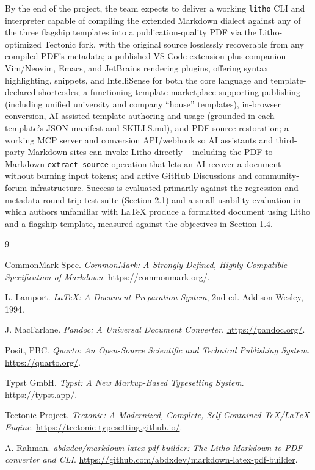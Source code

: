 \documentclass[a4paper,twoside]{article}
\begin{document}
By the end of the project, the team expects to deliver a working \texttt{litho} CLI and interpreter capable of compiling the extended Markdown dialect against any of the three flagship templates into a publication-quality PDF via the Litho-optimized Tectonic fork, with the original source losslessly recoverable from any compiled PDF's metadata; a published VS Code extension plus companion Vim/Neovim, Emacs, and JetBrains rendering plugins, offering syntax highlighting, snippets, and IntelliSense for both the core language and template-declared shortcodes; a functioning template marketplace supporting publishing (including unified university and company ``house'' templates), in-browser conversion, AI-assisted template authoring and usage (grounded in each template's JSON manifest and SKILLS.md), and PDF source-restoration; a working MCP server and conversion API/webhook so AI assistants and third-party Markdown sites can invoke Litho directly -- including the PDF-to-Markdown \texttt{extract-source} operation that lets an AI recover a document without burning input tokens; and active GitHub Discussions and community-forum infrastructure. Success is evaluated primarily against the regression and metadata round-trip test suite (Section 2.1) and a small usability evaluation in which authors unfamiliar with LaTeX produce a formatted document using Litho and a flagship template, measured against the objectives in Section 1.4.

\clearpage
\begin{thebibliography}{9}

CommonMark Spec. \textit{CommonMark: A Strongly Defined, Highly Compatible Specification of Markdown}. \url{https://commonmark.org/}.

L. Lamport. \textit{\LaTeX{}: A Document Preparation System}, 2nd ed. Addison-Wesley, 1994.

J. MacFarlane. \textit{Pandoc: A Universal Document Converter}. \url{https://pandoc.org/}.

Posit, PBC. \textit{Quarto: An Open-Source Scientific and Technical Publishing System}. \url{https://quarto.org/}.

Typst GmbH. \textit{Typst: A New Markup-Based Typesetting System}. \url{https://typst.app/}.

Tectonic Project. \textit{Tectonic: A Modernized, Complete, Self-Contained \TeX{}/\LaTeX{} Engine}. \url{https://tectonic-typesetting.github.io/}.

A. Rahman. \textit{abdxdev/markdown-latex-pdf-builder: The Litho Markdown-to-PDF converter and CLI}. \url{https://github.com/abdxdev/markdown-latex-pdf-builder}.

\end{thebibliography}
\end{document}
